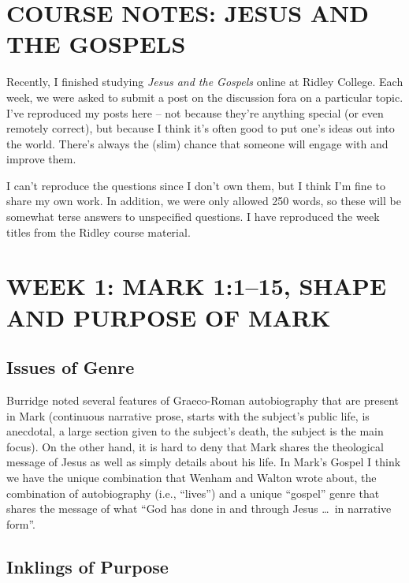 \newcommand{\Date}{December 22, 2019}
\newcommand{\Title}{Course Notes: Jesus and the Gospels}



\section{COURSE NOTES: JESUS AND THE GOSPELS}

Recently, I finished studying \textit{Jesus and the Gospels} online at Ridley
College. Each week, we were asked to submit a post on the discussion fora on a
particular topic. I've reproduced my posts here -- not because they're anything
special (or even remotely correct), but because I think it's often good to put
one's ideas out into the world. There's always the (slim) chance that someone
will engage with and improve them.

I can't reproduce the questions since I don't own them, but I think I'm fine to
share my own work. In addition, we were only allowed 250 words, so these will be
somewhat terse answers to unspecified questions. I have reproduced the week
titles from the Ridley course material.

\section{WEEK 1: MARK 1:1--15, SHAPE AND PURPOSE OF MARK}

\subsection{Issues of Genre}

Burridge noted several features of Graeco-Roman autobiography that are present
in Mark (continuous narrative prose, starts with the subject's public life, is
anecdotal, a large section given to the subject's death, the subject is the main
focus).\autocite[1-8]{burridge:2005} On the other hand, it is hard to deny that
Mark shares the theological message of Jesus as well as simply details about his
life. In Mark's Gospel I think we have the unique combination that Wenham and
Walton wrote about, the combination of autobiography (i.e., \enquote{lives}) and
a unique \enquote{gospel} genre that shares the message of what \enquote{God has
done in and through Jesus \dots\ in narrative
form}.\autocite[54]{wenham+walton:2011}

\subsection{Inklings of Purpose}

